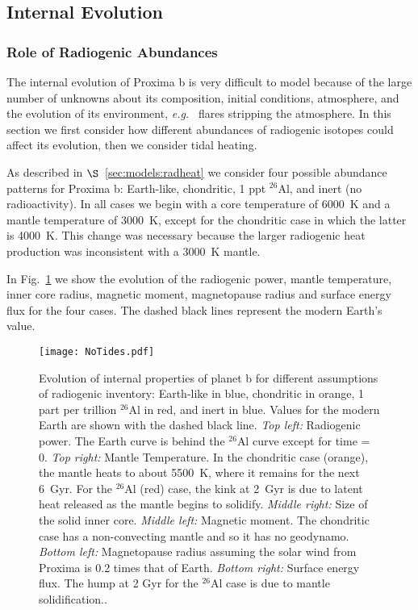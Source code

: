 \documentclass[preprint,12pt]{aastex}
\def\eg{{\it e.g.\ }}
\begin{document}
\subsection{Internal Evolution}
\label{sec:results:internal}

\subsubsection{Role of Radiogenic Abundances}

The internal evolution of Proxima b is very difficult to model because
of the large number of unknowns about its composition, initial
conditions, atmosphere, and the evolution of its environment, \eg
flares stripping the atmosphere. In this section we first consider how
different abundances of radiogenic isotopes could affect its
evolution, then we consider tidal heating.

As described in $\S$~\ref{sec:models:radheat} we consider four
possible abundance patterns for Proxima b: Earth-like, chondritic, 1
ppt $^{26}$Al, and inert (no radioactivity). In all cases we begin with a core
temperature of 6000~K and a mantle temperature of 3000~K, except for
the chondritic case in which the latter is 4000~K. This change was
necessary because the larger radiogenic heat production was
inconsistent with a 3000~K mantle.

In Fig.~\ref{fig:notides} we show the evolution of the radiogenic
power, mantle temperature, inner core radius, magnetic moment,
magnetopause radius and surface energy flux for the four cases. The
dashed black lines represent the modern Earth's value.

\begin{figure} 
\begin{center}
\texttt{[image: NoTides.pdf]}
\end{center}
\caption{Evolution of internal properties of planet b for different
  assumptions of radiogenic inventory: Earth-like in blue, chondritic
  in orange, 1 part per trillion $^{26}$Al in red, and inert in
  blue. Values for the modern Earth are shown with the dashed black
  line. {\it Top left:} Radiogenic power. The Earth curve is behind
  the $^{26}$Al curve except for time = 0. {\it Top right:} Mantle
  Temperature. In the chondritic case (orange), the mantle heats to
  about 5500~K, where it remains for the next 6~Gyr. For the $^{26}$Al
  (red) case, the kink at 2~Gyr is due to latent heat released as the
  mantle begins to solidify. {\it Middle right:} Size of the solid
  inner core. {\it Middle left:} Magnetic moment. The chondritic case
  has a non-convecting mantle and so it has no geodynamo. {\it Bottom
    left:} Magnetopause radius assuming the solar wind from Proxima is
  0.2 times that of Earth. {\it Bottom right:} Surface energy
  flux. The hump at 2 Gyr for the $^{26}$Al case is due to mantle
  solidification..}
\label{fig:notides}
\end{figure}
\end{document}
